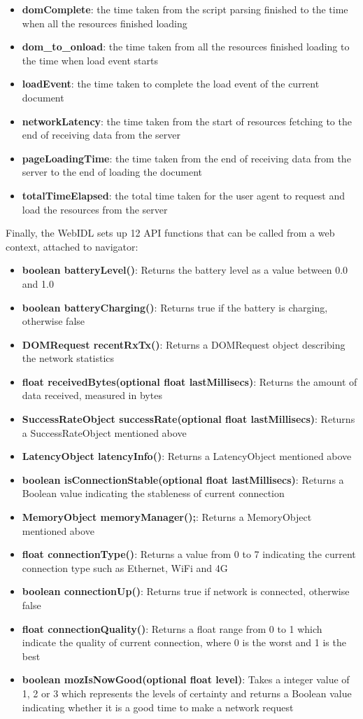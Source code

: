 \documentclass[12pt]{article}
\begin{document}
\begin{itemize}
  \item \textbf{domComplete}: the time taken from the script parsing finished to the time when all the resources finished loading
  \item \textbf{dom\_to\_onload}: the time taken from all the resources finished loading to the time when load event starts
  \item \textbf{loadEvent}: the time taken to complete the load event of the current document
  \item \textbf{networkLatency}: the time taken from the start of resources fetching to the end of receiving data from the server
  \item \textbf{pageLoadingTime}: the time taken from the end of receiving data from the server to the end of loading the document
  \item \textbf{totalTimeElapsed}: the total time taken for the user agent to request and load the resources from the server
\end{itemize}

Finally, the WebIDL sets up 12 API functions that can be called from a web context, attached to navigator:
\begin{itemize}
  \item \textbf{boolean batteryLevel()}: Returns the battery level as a value between 0.0 and 1.0
  \item \textbf{boolean batteryCharging()}: Returns true if the battery is charging, otherwise false
  \item \textbf{DOMRequest recentRxTx()}: Returns a DOMRequest object describing the network statistics
  \item \textbf{float receivedBytes(optional float lastMillisecs)}: Returns the amount of data received, measured in bytes
  \item \textbf{SuccessRateObject successRate(optional float lastMillisecs)}: Returns a SuccessRateObject mentioned above
  \item \textbf{LatencyObject latencyInfo()}: Returns a LatencyObject mentioned above
  \item \textbf{boolean isConnectionStable(optional float lastMillisecs)}: Returns a Boolean value indicating the stableness of current connection
  \item \textbf{MemoryObject memoryManager();}: Returns a MemoryObject mentioned above
  \item \textbf{float connectionType()}: Returns a value from 0 to 7 indicating the current connection type such as Ethernet, WiFi and 4G
  \item \textbf{boolean connectionUp()}: Returns true if network is connected, otherwise false
  \item \textbf{float connectionQuality()}: Returns a float range from 0 to 1 which indicate the quality of current connection, where 0 is the worst and 1 is the best
  \item \textbf{boolean mozIsNowGood(optional float level)}: Takes a integer value of 1, 2 or 3 which represents the levels of certainty and returns a Boolean value indicating whether it is a good time to make a network request
\end{itemize}
\end{document}
